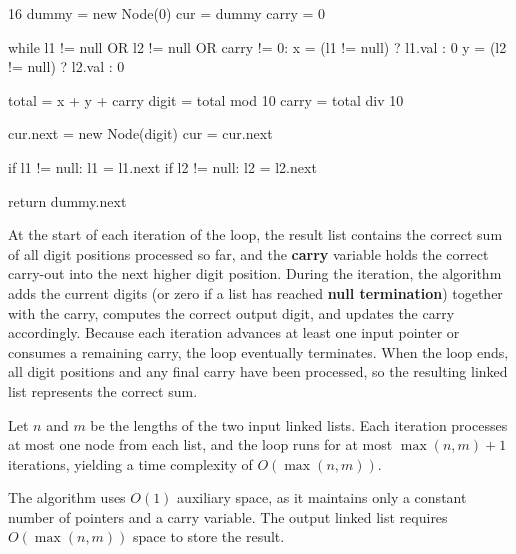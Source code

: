 \Algorithm
\begin{CodeBlock}[style=pseudo,caption={Pseudocode}]{16}
    dummy = new Node(0)
    cur = dummy
    carry = 0

    while l1 != null OR l2 != null OR carry != 0:
        x = (l1 != null) ? l1.val : 0
        y = (l2 != null) ? l2.val : 0

        total = x + y + carry
        digit = total mod 10
        carry = total div 10

        cur.next = new Node(digit)
        cur = cur.next

        if l1 != null: l1 = l1.next
        if l2 != null: l2 = l2.next

    return dummy.next
\end{CodeBlock}


\Correctness
At the start of each iteration of the loop, the result list contains the correct
sum of all digit positions processed so far, and the \textbf{carry} variable
holds the correct carry-out into the next higher digit position.
During the iteration, the algorithm adds the current digits (or zero if a list
has reached \textbf{null termination}) together with the carry, computes the
correct output digit, and updates the carry accordingly.
Because each iteration advances at least one input pointer or consumes a
remaining carry, the loop eventually terminates.
When the loop ends, all digit positions and any final carry have been processed,
so the resulting linked list represents the correct sum.


\Complexity
Let $n$ and $m$ be the lengths of the two input linked lists.
Each iteration processes at most one node from each list, and the loop runs for
at most $\max(n, m) + 1$ iterations, yielding a time complexity of
$O(\max(n, m))$.

The algorithm uses $O(1)$ auxiliary space, as it maintains only a constant
number of pointers and a carry variable.
The output linked list requires $O(\max(n, m))$ space to store the result.



